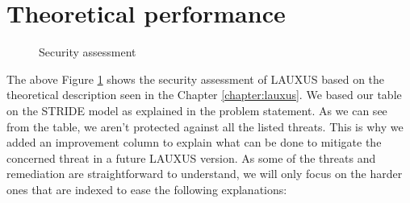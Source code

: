 \documentclass[../main.tex]{subfiles}
\begin{document}
\section{Theoretical performance}
\label{section:analysis:theoric_performance}
\begin{figure}[h]
    \centering
    
    \caption{Security assessment}
    \label{figure:analysis:security_assessment}
\end{figure}
\par The above Figure \ref{figure:analysis:security_assessment} shows the security assessment of LAUXUS based on the theoretical description seen in the Chapter \ref{chapter:lauxus}. We based our table on the STRIDE model as explained in the problem statement. As we can see from the table, we aren't protected against all the listed threats. This is why we added an improvement column to explain what can be done to mitigate the concerned threat in a future LAUXUS version. As some of the threats and remediation are straightforward to understand, we will only focus on the harder ones that are indexed to ease the following explanations:
\end{document}
